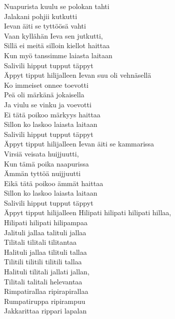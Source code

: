 
Nuapurista kuulu se polokan tahti\\
Jalakani pohjii kutkutti\\
Ievan äiti se tyttöösä vahti\\
Vaan kyllähän Ieva sen jutkutti,\\
Sillä ei meitä silloin kiellot haittaa\\
Kun myö tanssimme laiasta laitaan\\
Salivili hipput tupput täppyt\\
Äppyt tipput hilijalleen
\hops
Ievan suu oli vehnäsellä\\
Ko immeiset onnee toevotti\\
Peä oli märkänä jokaisella\\
Ja viulu se vinku ja voevotti\\
Ei tätä poikoo märkyys haittaa\\
Sillon ko laskoo laiasta laitaan\\
Salivili hipput tupput täppyt\\
Äppyt tipput hilijalleen
\hops
Ievan äiti se kammarissa\\
Virsiä veisata huijjuutti,\\
Kun tämä poika naapurissa\\
Ämmän tyttöä nuijjuutti\\
Eikä tätä poikoo ämmät haittaa\\
Sillon ko laskoo laiasta laitaan\\
Salivili hipput tupput täppyt\\
Äppyt tipput hilijalleen
\hops
{} Hilipati hilipati hilipati hillaa,\\
 Hilipati hilipati hilipampaa\\
 Jalituli jallaa talituli jallaa\\
 Tilitali tilitali tilitantaa\\
 Halituli jallaa tilituli tallaa\\
 Tilitili tilitili tilitili tallaa\\
 Halituli tilitali jallati jallan,\\
 Tilitali talitali helevantaa\\
\hops
{} Rimpatirallaa ripirapirallaa\\
 Rumpatiruppa ripirampuu\\
 Jakkarittaa rippari lapalan\\

